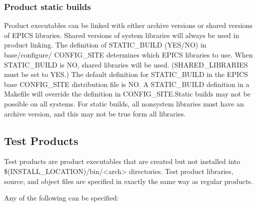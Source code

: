 \subsubsection{Product static builds}

Product executables can be linked with either archive versions or shared versions of EPICS libraries. Shared versions of 
system libraries will always be used in product linking. The definition of STATIC\_BUILD (YES/NO) in base/configure/
CONFIG\_SITE determines which EPICS libraries to use. When STATIC\_BUILD is NO, shared libraries will be used.  
(SHARED\_LIBRARIES must be set to YES.) The default definition for STATIC\_BUILD in the EPICS base 
CONFIG\_SITE distribution file is NO. A STATIC\_BUILD definition in a Makefile will override the definition in 
CONFIG\_SITE.Static builds may not be possible on all systems. For static builds, all nonsystem libraries must have an 
archive version, and this may not be true form all libraries.

\subsection{Test Products}

Test products are product executables that are created but not installed into \$(INSTALL\_LOCATION)/bin/\textless{}arch\textgreater{} 
directories. Test product libraries, source, and object files are specified in exactly the same way as regular products. 

Any of the following can be specified:

